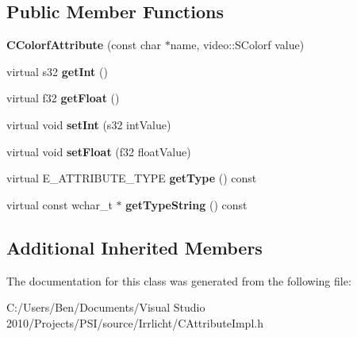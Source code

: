 \subsection*{Public Member Functions}
\begin{DoxyCompactItemize}
\item 
\hypertarget{classirr_1_1io_1_1_c_colorf_attribute_a24dad845c0b10e8665d64bc8d5d332df}{{\bfseries C\-Colorf\-Attribute} (const char $\ast$name, video\-::\-S\-Colorf value)}\label{classirr_1_1io_1_1_c_colorf_attribute_a24dad845c0b10e8665d64bc8d5d332df}

\item 
\hypertarget{classirr_1_1io_1_1_c_colorf_attribute_a6f4470855aa084bbe91160c1ca0fa22f}{virtual s32 {\bfseries get\-Int} ()}\label{classirr_1_1io_1_1_c_colorf_attribute_a6f4470855aa084bbe91160c1ca0fa22f}

\item 
\hypertarget{classirr_1_1io_1_1_c_colorf_attribute_accebf0df7201f64d3ecdcb349571a018}{virtual f32 {\bfseries get\-Float} ()}\label{classirr_1_1io_1_1_c_colorf_attribute_accebf0df7201f64d3ecdcb349571a018}

\item 
\hypertarget{classirr_1_1io_1_1_c_colorf_attribute_a61b1e5997dfd71691ea6a08757f26ef6}{virtual void {\bfseries set\-Int} (s32 int\-Value)}\label{classirr_1_1io_1_1_c_colorf_attribute_a61b1e5997dfd71691ea6a08757f26ef6}

\item 
\hypertarget{classirr_1_1io_1_1_c_colorf_attribute_afdb1d7f8bcb578e1621127960bfd4c95}{virtual void {\bfseries set\-Float} (f32 float\-Value)}\label{classirr_1_1io_1_1_c_colorf_attribute_afdb1d7f8bcb578e1621127960bfd4c95}

\item 
\hypertarget{classirr_1_1io_1_1_c_colorf_attribute_aaf4775a5efbdf441caa96ddaad980a53}{virtual E\-\_\-\-A\-T\-T\-R\-I\-B\-U\-T\-E\-\_\-\-T\-Y\-P\-E {\bfseries get\-Type} () const }\label{classirr_1_1io_1_1_c_colorf_attribute_aaf4775a5efbdf441caa96ddaad980a53}

\item 
\hypertarget{classirr_1_1io_1_1_c_colorf_attribute_a08216396395744b1591be7c3b731d90d}{virtual const wchar\-\_\-t $\ast$ {\bfseries get\-Type\-String} () const }\label{classirr_1_1io_1_1_c_colorf_attribute_a08216396395744b1591be7c3b731d90d}

\end{DoxyCompactItemize}
\subsection*{Additional Inherited Members}


The documentation for this class was generated from the following file\-:\begin{DoxyCompactItemize}
\item 
C\-:/\-Users/\-Ben/\-Documents/\-Visual Studio 2010/\-Projects/\-P\-S\-I/source/\-Irrlicht/C\-Attribute\-Impl.\-h\end{DoxyCompactItemize}
